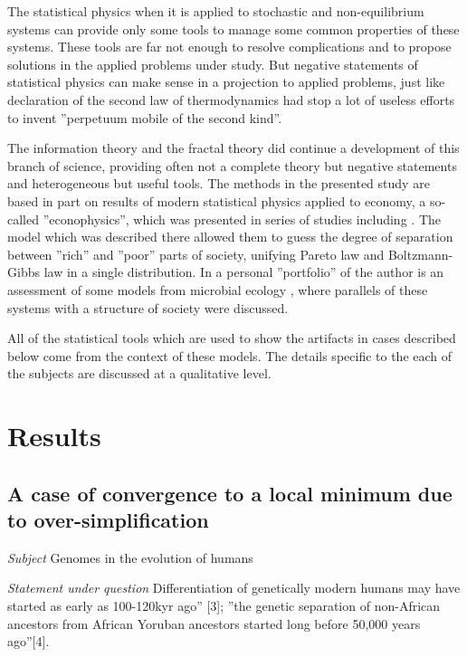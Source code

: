 \documentclass[12pt,aps]{revtex4}
\begin{document}
The statistical physics when it is applied to stochastic and non-equilibrium systems can provide only some tools to manage some common properties of these systems. These tools are far not enough to resolve complications and to propose solutions in the applied problems under study. But negative statements of statistical physics can make sense in a projection to applied problems, just like declaration of the second law of thermodynamics had stop a lot of useless efforts to invent ''perpetuum mobile of the second kind''.

The information theory and the fractal theory did continue a development of this branch of science, providing often not a complete theory but negative statements and heterogeneous but useful tools. The methods in the presented study are based in part on results of modern statistical physics applied to economy, a so-called ''econophysics'', which was presented in series of studies including \cite{CI1}. The model which was described there allowed them to guess the degree of separation between ''rich'' and ''poor'' parts of society, unifying Pareto law and Boltzmann-Gibbs law in a single distribution. In a personal ''portfolio'' of the author is an assessment of some models from microbial ecology \cite{CI2}, where parallels of these systems with a structure of society were discussed.

All of the statistical tools which are used to show the artifacts in cases described below come from the context of these models. The details specific to the each of the subjects are discussed at a qualitative level. 

\section{Results}

\subsection{A case of convergence to a local minimum due to over-simplification}

\emph{Subject} Genomes in the evolution of humans

\emph{Statement under question} Differentiation of genetically modern humans may have started as early as 100-120kyr ago” [3]; ”the genetic separation of non-African ancestors from African Yoruban ancestors started long before 50,000 years ago”[4].
\end{document}
